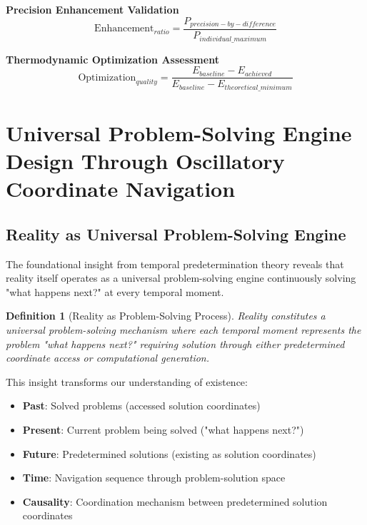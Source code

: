\documentclass[12pt,a4paper]{article}
\newtheorem{definition}{Definition}
\begin{document}
\textbf{Precision Enhancement Validation}
\begin{equation}
\text{Enhancement}_{ratio} = \frac{P_{precision-by-difference}}{P_{individual\_maximum}}
\end{equation}

\textbf{Thermodynamic Optimization Assessment}
\begin{equation}
\text{Optimization}_{quality} = \frac{E_{baseline} - E_{achieved}}{E_{baseline} - E_{theoretical\_minimum}}
\end{equation}

\section{Universal Problem-Solving Engine Design Through Oscillatory Coordinate Navigation}

\subsection{Reality as Universal Problem-Solving Engine}

The foundational insight from temporal predetermination theory reveals that reality itself operates as a universal problem-solving engine continuously solving "what happens next?" at every temporal moment.

\begin{definition}[Reality as Problem-Solving Process]
Reality constitutes a universal problem-solving mechanism where each temporal moment represents the problem "what happens next?" requiring solution through either predetermined coordinate access or computational generation.
\end{definition}

This insight transforms our understanding of existence:
\begin{itemize}
\item \textbf{Past}: Solved problems (accessed solution coordinates)
\item \textbf{Present}: Current problem being solved ("what happens next?")
\item \textbf{Future}: Predetermined solutions (existing as solution coordinates)
\item \textbf{Time}: Navigation sequence through problem-solution space
\item \textbf{Causality}: Coordination mechanism between predetermined solution coordinates
\end{itemize}
\end{document}
